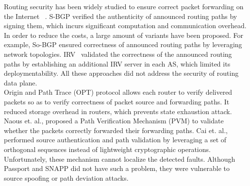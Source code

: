 Routing security has been widely studied to ensure correct packet forwarding on the Internet~\cite{kent2000secure} \cite{hu2004spv} \cite{goodell2003working} \cite{ng2004extensions} \cite{candolin2005packet} \cite{hu2013general}. S-BGP \cite{kent2000secure} verified the authenticity of announced routing paths by signing them, which incurs significant computation and communication overhead. In order to reduce the costs, a large amount of variants have been proposed. For example, So-BGP \cite{ng2004extensions} ensured correctness of announced routing paths by leveraging network topologies. IRV~\cite{goodell2003working} validated the correctness of the announced routing paths by establishing an additional IRV server in each AS, which limited its deploymentability. All these approaches did not address the security of routing data plane.\\
Origin and Path Trace (OPT) protocol \cite{kim2014lightweight} \cite{zhang2014mechanized} allows each router to verify delivered packets so as to verify correctness of packet source and forwarding paths. It reduced storage overhead in routers, which prevents state exhaustion attack. Naous et. al., \cite{naous2011verifying} proposed a Path Verification Mechanism (PVM) %
to validate whether the packets correctly forwarded their forwarding paths. Cai et. al.,~\cite{cai2015source} performed source authentication and path validation by leveraging a set of orthogonal sequences instead of lightweight cryptographic operations. Unfortunately, these mechanism cannot localize the detected faults.
Although Passport \cite{liu2008passport} and SNAPP \cite{barak2008protocols} did not have such a  problem, they were vulnerable to source spoofing or path deviation attacks.\\
